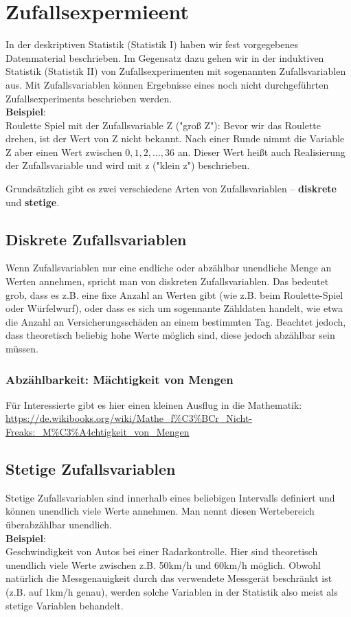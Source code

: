 \documentclass[a4paper]{article}
\begin{document}
\newpage
\section{Zufallsexpermieent}

In der deskriptiven Statistik (Statistik I) haben wir fest vorgegebenes Datenmaterial beschrieben. Im Gegensatz dazu gehen wir in der induktiven Statistik (Statistik II) von Zufallsexperimenten mit sogenannten Zufallsvariablen aus. Mit Zufallsvariablen können Ergebnisse eines noch nicht durchgeführten Zufallsexperiments beschrieben werden.\\
\noindent \textbf{Beispiel}:\\
Roulette Spiel mit der Zufallsvariable Z ("groß Z"): Bevor wir das Roulette drehen, ist der Wert von Z nicht bekannt. Nach einer Runde nimmt die Variable Z aber einen Wert zwischen $0,1,2,...,36$ an. Dieser Wert heißt auch Realisierung der Zufallsvariable und wird mit z ("klein z") beschrieben.

\noindent Grundsätzlich gibt es zwei verschiedene Arten von Zufallsvariablen -- \textbf{diskrete} und \textbf{stetige}. 

\subsection{Diskrete Zufallsvariablen} \label{sec:DZV}
Wenn Zufallsvariablen nur eine endliche oder abzählbar unendliche Menge an Werten annehmen, spricht man von diskreten Zufallsvariablen. Das bedeutet grob, dass es z.B. eine fixe Anzahl an Werten gibt (wie z.B. beim Roulette-Spiel oder Würfelwurf), oder dass es sich um sogennante Zähldaten handelt, wie etwa die Anzahl an Versicherungsschäden an einem bestimmten Tag. Beachtet jedoch, dass theoretisch beliebig hohe Werte möglich sind, diese jedoch abzählbar sein müssen. 

\subsubsection{Abzählbarkeit: Mächtigkeit von Mengen} \label{sec:Mengen}
Für Interessierte gibt es hier einen kleinen Ausflug in die Mathematik:\\ \url{https://de.wikibooks.org/wiki/Mathe_f\%C3\%BCr_Nicht-Freaks:_M\%C3\%A4chtigkeit_von_Mengen}


\subsection{Stetige Zufallsvariablen} \label{sec:SZV}
Stetige Zufallsvariablen sind innerhalb eines beliebigen Intervalls definiert und können unendlich viele Werte annehmen. Man nennt diesen Wertebereich überabzählbar unendlich.\\
\noindent \textbf{Beispiel}:\\
Geschwindigkeit von Autos bei einer Radarkontrolle. Hier sind theoretisch unendlich viele Werte zwischen z.B. 50km/h und 60km/h möglich. Obwohl natürlich die Messgenauigkeit durch das verwendete Messgerät beschränkt ist (z.B. auf 1km/h genau), werden solche Variablen in der Statistik also meist als stetige Variablen behandelt.
\end{document}
